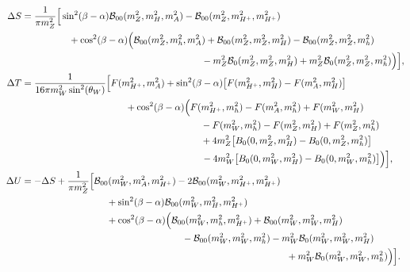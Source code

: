 \documentclass[aps,superscriptaddress,nofootinbib,floatfix,notitlepage]{revtex4-1}
\begin{document}
\begin{align}
 \Delta S &= \frac{1}{\pi m_Z^2} \Big[ \sin^2 (\beta-\alpha ) {\cal B}_{00}(m_Z^2,m_H^2,m_A^2) - {\cal B}_{00}(m_Z^2,m_{H^+}^2,m_{H^+}^2) \phantom{\Big]} \nonumber \\
 & \hspace*{50pt} + \cos^2 (\beta-\alpha ) \Big( {\cal B}_{00}(m_Z^2,m_h^2,m_A^2) + {\cal B}_{00}(m_Z^2,m_Z^2,m_H^2) - {\cal B}_{00}(m_Z^2,m_Z^2,m_h^2) \phantom{\Big)} \nonumber \\
 & \phantom{\Big[} \phantom{\Big(} \hspace*{180pt} - m_Z^2 {\cal B}_0(m_Z^2,m_Z^2,m_H^2) + m_Z^2 {\cal B}_0(m_Z^2,m_Z^2,m_h^2) \Big) \Big] ,\nonumber \\
\Delta T &= \frac{1}{16\pi m_W^2 \sin^2 (\theta_W)} \Big[ F(m_{H^+}^2,m_A^2) + \sin^2 (\beta -\alpha ) \big[ F(m_{H^+}^2,m_H^2) - F(m_A^2,m_H^2)\big] \phantom{\Big]} \nonumber \\
 & \hspace*{110pt} + \cos^2 (\beta-\alpha ) \Big( F(m_{H^+}^2,m_h^2) - F(m_A^2,m_h^2) + F(m_W^2,m_H^2) \phantom{\Big)} \nonumber \\
 & \hspace*{190pt} - F(m_W^2,m_h^2) - F(m_Z^2,m_H^2) + F(m_Z^2,m_h^2) \nonumber \\
 & \hspace*{190pt} + 4 m_Z^2 \big[ B_0(0,m_Z^2,m_H^2) - B_0(0,m_Z^2,m_h^2)\big] \nonumber \\
 & \phantom{\Big[} \phantom{\Big(} \hspace*{180pt} - 4 m_W^2 \big[ B_0(0,m_W^2,m_H^2) - B_0(0,m_W^2,m_h^2)\big] \Big) \Big] ,\nonumber \\
\Delta U &= - \Delta S + \frac{1}{\pi m_Z^2} \Big[ {\cal B}_{00}(m_W^2,m_A^2,m_{H^+}^2) - 2 {\cal B}_{00}(m_W^2,m_{H^+}^2,m_{H^+}^2) \phantom{\Big]} \nonumber \\
 & \hspace*{90pt} + \sin^2 (\beta -\alpha ) {\cal B}_{00}(m_W^2,m_H^2,m_{H^+}^2) \nonumber \\
 & \hspace*{90pt} + \cos^2 (\beta-\alpha ) \Big( {\cal B}_{00}(m_W^2,m_h^2,m_{H^+}^2) + {\cal B}_{00}(m_W^2,m_W^2,m_H^2) \phantom{\Big)} \nonumber \\
 & \hspace*{170pt} - {\cal B}_{00}(m_W^2,m_W^2,m_h^2) - m_W^2 {\cal B}_0(m_W^2,m_W^2,m_H^2) \nonumber \\
 & \phantom{\Big[} \phantom{\Big(} \hspace*{270pt} + m_W^2 {\cal B}_0(m_W^2,m_W^2,m_h^2) \Big) \Big] .\nonumber
\end{align}
\end{document}
